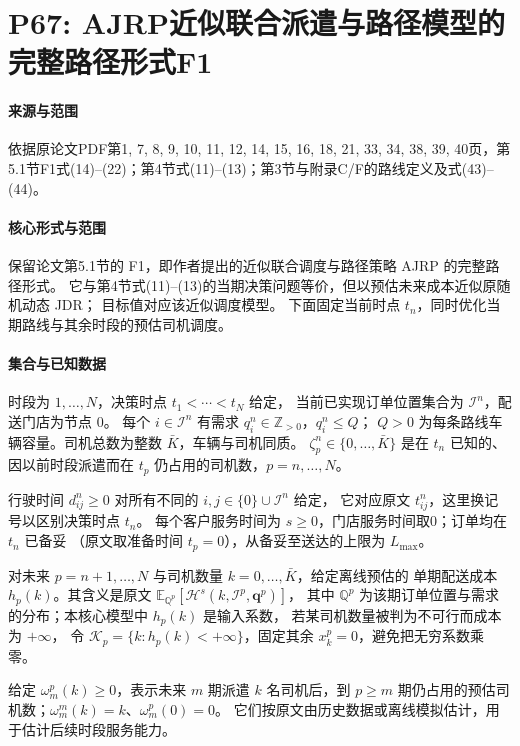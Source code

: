 \documentclass[UTF8,11pt]{ctexart}
\begin{document}
\section*{P67: AJRP近似联合派遣与路径模型的完整路径形式F1}
\paragraph{来源与范围}依据原论文PDF第1, 7, 8, 9, 10, 11, 12, 14, 15, 16, 18, 21, 33, 34, 38, 39, 40页，第5.1节F1式(14)--(22)；第4节式(11)--(13)；第3节与附录C/F的路线定义及式(43)--(44)。

\paragraph{核心形式与范围}
保留论文第5.1节的 F1，即作者提出的近似联合调度与路径策略 AJRP 的完整路径形式。
它与第4节式(11)--(13)的当期决策问题等价，但以预估未来成本近似原随机动态 JDR；
目标值对应该近似调度模型。
下面固定当前时点 $t_n$，同时优化当期路线与其余时段的预估司机调度。

\paragraph{集合与已知数据}
时段为 $1,\ldots,N$，决策时点 $t_1<\cdots<t_N$ 给定，
当前已实现订单位置集合为 $\mathcal I^n$，配送门店为节点 $0$。
每个 $i\in\mathcal I^n$ 有需求 $q_i^n\in\mathbb Z_{>0}$，$q_i^n\le Q$；
$Q>0$ 为每条路线车辆容量。司机总数为整数 $\bar K$，车辆与司机同质。
$\zeta_p^n\in\{0,\ldots,\bar K\}$ 是在 $t_n$ 已知的、因以前时段派遣而在
$t_p$ 仍占用的司机数，$p=n,\ldots,N$。

行驶时间 $d_{ij}^n\ge0$ 对所有不同的 $i,j\in\{0\}\cup\mathcal I^n$ 给定，
它对应原文 $t_{ij}^n$，这里换记号以区别决策时点 $t_n$。
每个客户服务时间为 $s\ge0$，门店服务时间取0；订单均在 $t_n$ 已备妥
（原文取准备时间 $t_p=0$），从备妥至送达的上限为 $L_{\max}$。

对未来 $p=n+1,\ldots,N$ 与司机数量 $k=0,\ldots,\bar K$，给定离线预估的
单期配送成本 $h_p(k)$。其含义是原文
$\mathbb E_{\mathbb Q^p}[\mathcal H^s(k,\mathcal I^p,\mathbf q^p)]$，
其中 $\mathbb Q^p$ 为该期订单位置与需求的分布；本核心模型中 $h_p(k)$ 是输入系数，
若某司机数量被判为不可行而成本为 $+\infty$，
令 $\mathcal K_p=\{k:h_p(k)<+\infty\}$，固定其余 $x_k^p=0$，避免把无穷系数乘零。

给定 $\omega_m^p(k)\ge0$，表示未来 $m$ 期派遣 $k$ 名司机后，到 $p\ge m$
期仍占用的预估司机数；$\omega_m^m(k)=k$、$\omega_m^p(0)=0$。
它们按原文由历史数据或离线模拟估计，用于估计后续时段服务能力。
\end{document}
